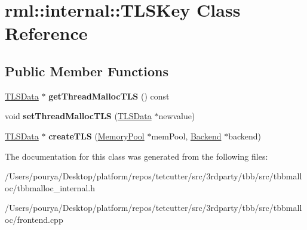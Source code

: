 \hypertarget{classrml_1_1internal_1_1TLSKey}{}\section{rml\+:\+:internal\+:\+:T\+L\+S\+Key Class Reference}
\label{classrml_1_1internal_1_1TLSKey}
\subsection*{Public Member Functions}
\begin{DoxyCompactItemize}
\item 
\hypertarget{classrml_1_1internal_1_1TLSKey_a43594b70dea0c5834e333b05955e62c1}{}\hyperlink{classrml_1_1internal_1_1TLSData}{T\+L\+S\+Data} $\ast$ {\bfseries get\+Thread\+Malloc\+T\+L\+S} () const \label{classrml_1_1internal_1_1TLSKey_a43594b70dea0c5834e333b05955e62c1}

\item 
\hypertarget{classrml_1_1internal_1_1TLSKey_af482c91d6b8aff61e3a45c4a41cf09c9}{}void {\bfseries set\+Thread\+Malloc\+T\+L\+S} (\hyperlink{classrml_1_1internal_1_1TLSData}{T\+L\+S\+Data} $\ast$newvalue)\label{classrml_1_1internal_1_1TLSKey_af482c91d6b8aff61e3a45c4a41cf09c9}

\item 
\hypertarget{classrml_1_1internal_1_1TLSKey_a06d9e3bc08d87039bdcc081d3b6b10cb}{}\hyperlink{classrml_1_1internal_1_1TLSData}{T\+L\+S\+Data} $\ast$ {\bfseries create\+T\+L\+S} (\hyperlink{classrml_1_1internal_1_1MemoryPool}{Memory\+Pool} $\ast$mem\+Pool, \hyperlink{classrml_1_1internal_1_1Backend}{Backend} $\ast$backend)\label{classrml_1_1internal_1_1TLSKey_a06d9e3bc08d87039bdcc081d3b6b10cb}

\end{DoxyCompactItemize}


The documentation for this class was generated from the following files\+:\begin{DoxyCompactItemize}
\item 
/\+Users/pourya/\+Desktop/platform/repos/tetcutter/src/3rdparty/tbb/src/tbbmalloc/tbbmalloc\+\_\+internal.\+h\item 
/\+Users/pourya/\+Desktop/platform/repos/tetcutter/src/3rdparty/tbb/src/tbbmalloc/frontend.\+cpp\end{DoxyCompactItemize}

